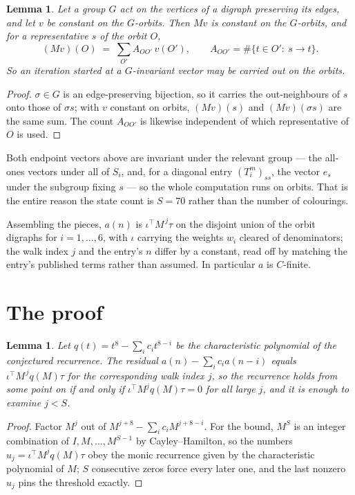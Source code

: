 \documentclass[11pt,a4paper]{article}
\theoremstyle{plain}
\newtheorem{lemma}[theorem]{Lemma}
\theoremstyle{definition}
\begin{document}
\begin{lemma}\label{lem:lump}
Let a group $G$ act on the vertices of a digraph preserving its edges, and let $v$ be constant
on the $G$-orbits. Then $Mv$ is constant on the $G$-orbits, and for a representative $s$ of
the orbit $O$,
\[
(Mv)(O)\;=\;\sum_{O'}A_{OO'}\,v(O'),\qquad
A_{OO'}=\#\{t\in O':\ s\to t\} .
\]
So an iteration started at a $G$-invariant vector may be carried out on the orbits.
\end{lemma}

\begin{proof}
$\sigma\in G$ is an edge-preserving bijection, so it carries the out-neighbours of $s$ onto
those of $\sigma s$; with $v$ constant on orbits, $(Mv)(s)$ and $(Mv)(\sigma s)$ are the same
sum. The count $A_{OO'}$ is likewise independent of which representative of $O$ is used.
\end{proof}

Both endpoint vectors above are invariant under the relevant group --- the all-ones vectors
under all of $S_i$, and, for a diagonal entry $(T_i^m)_{ss}$, the vector $e_s$ under the
subgroup fixing $s$ --- so the whole computation runs on orbits. That is the entire reason the
state count is $S=70$ rather than the number of colourings.

Assembling the pieces, $a(n)$ is $\iota^{\!\top}M^{\,j}\tau$ on the disjoint union of the
orbit digraphs for $i=1,\dots,6$, with $\iota$ carrying the weights $w_i$ cleared of
denominators; the walk index $j$ and the entry's $n$ differ by a constant, read off by
matching the entry's published terms rather than assumed. In particular $a$ is $C$-finite.

\section{The proof}

\begin{lemma}\label{lem:crit}
Let $q(t)=t^{8}-\sum_i c_it^{8-i}$ be the characteristic polynomial of the
conjectured recurrence. The residual $a(n)-\sum_ic_ia(n-i)$ equals
$\iota^{\!\top}M^{\,j}q(M)\tau$ for the corresponding walk index $j$, so the recurrence
holds from some point on if and only if $\iota^{\!\top}M^{j}q(M)\tau=0$ for all large $j$,
and it is enough to examine $j<S$.
\end{lemma}

\begin{proof}
Factor $M^{j}$ out of $M^{j+8}-\sum_ic_iM^{j+8-i}$. For the bound, $M^{S}$
is an integer combination of $I,M,\dots,M^{S-1}$ by Cayley--Hamilton, so the numbers
$u_j=\iota^{\!\top}M^{j}q(M)\tau$ obey the monic recurrence given by the characteristic
polynomial of $M$; $S$ consecutive zeros force every later one, and the last nonzero $u_j$
pins the threshold exactly.
\end{proof}
\end{document}
